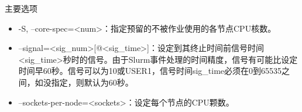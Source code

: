 \begin{frame}{主要选项}
\begin{itemize}
    \item -S, --core-spec=<num>：指定预留的不被作业使用的各节点CPU核数。
    \item --signal=<sig\_num>[@<sig\_time>]：设定到其终止时间前信号时间<sig\_time>秒时的信号。由于Slurm事件处理的时间精度，信号有可能比设定时间早60秒。信号可以为10或USER1，信号时间sig\_time必须在0到65535之间，如没指定，则默认为60秒。
    \item  --sockets-per-node=<sockets>：设定每个节点的CPU颗数。

\end{itemize}
\end{frame}
